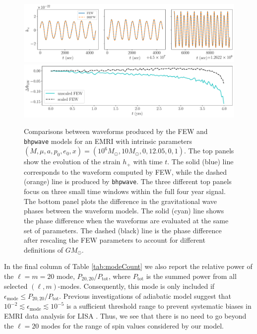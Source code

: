 \documentclass[%
 reprint,
 nofootinbib,
 amsmath,amssymb,
 aps,
 prd,
]{revtex4-2}
\begin{document}
\begin{figure}[!htp]
    \centering
    \includegraphics[width=0.98\linewidth]{figures/few_bhpwave_overlay.pdf}
    \includegraphics[width=0.98\linewidth]{figures/few_phase_comparison.pdf}
    \caption{Comparisons between waveforms produced by the FEW and \texttt{bhpwave} models for an EMRI with intrinsic parameters $(M, \mu, a, p_0, e_0, x) = (10^6 M_\odot, 10 M_\odot, 0, 12.05, 0, 1)$. The top panels show the evolution of the strain $h_+$ with time $t$. The solid (blue) line corresponds to the waveform computed by FEW, while the dashed (orange) line is produced by \texttt{bhpwave}. The three different top panels focus on three small time windows within the full four year signal. The bottom panel plots the difference in the gravitational wave phases between the waveform models. The solid (cyan) line shows the phase difference when the waveforms are evaluated at the same set of parameters. The dashed (black) line is the phase difference after rescaling the FEW parameters to account for different definitions of $GM_\odot$.}
    \label{fig:compareFEW}
\end{figure}


In the final column of Table \ref{tab:modeCount} we also report the relative power of the $\ell = m = 20$ mode, $P_{20,20}/P_\mathrm{tot}$, where $P_\mathrm{tot}$ is the summed power from all selected $(\ell, m)$-modes. Consequently, this mode is only included if $\epsilon_\mathrm{mode} \leq P_{20,20}/P_\mathrm{tot}$. Previous investigations of adiabatic model suggest that $ 10^{-2} \lesssim \epsilon_\mathrm{mode} \lesssim 10^{-5}$ is a sufficient threshold range to prevent systematic biases in EMRI data analysis for LISA \cite{KatzETC20}. Thus, we see that there is no need to go beyond the $\ell = 20$ modes for the range of spin values considered by our model.
\end{document}
